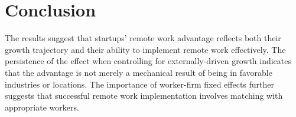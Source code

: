\documentclass[11pt]{article}
\begin{document}
\section{Conclusion}

The results suggest that startups' remote work advantage reflects both their growth trajectory and their ability to implement remote work effectively. The persistence of the effect when controlling for externally-driven growth indicates that the advantage is not merely a mechanical result of being in favorable industries or locations. The importance of worker-firm fixed effects further suggests that successful remote work implementation involves matching with appropriate workers.
\end{document}
